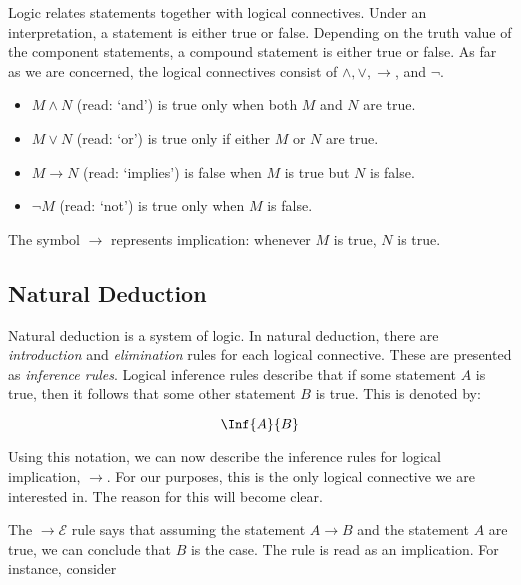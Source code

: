  Logic relates statements together with logical connectives.
  Under an interpretation, a statement is either true or false.
  Depending on the truth value of the component statements, a compound statement is either true or false.
  As far as we are concerned, the logical connectives consist of $\land, \lor, \to$, and $\neg$.
  \begin{itemize}
    \item $M \land N$ (read: `and') is true only when both $M$ and $N$ are true.
    \item $M \lor N$ (read: `or') is true only if either $M$ or $N$ are true. 
    \item $M \to N$ (read: `implies') is false when $M$ is true but $N$ is false.
    \item $\neg M$ (read: `not') is true only when $M$ is false.
  \end{itemize}
  The symbol $\to$ represents implication: whenever $M$ is true, $N$ is true.
  
  \subsection{Natural Deduction}
 
  Natural deduction is a system of logic.
  In natural deduction, there are \emph{introduction} and \emph{elimination} rules for each logical connective.
  These are presented as \emph{inference rules}.
  Logical inference rules describe that if some statement $A$ is true,
  then it follows that some other statement $B$ is true.
  This is denoted by:
  
  \[
    \Inf{A}{B} 
  \]
  
  Using this notation, we can now describe the inference rules for logical implication, $\to$.
  For our purposes, this is the only logical connective we are interested in.
  The reason for this will become clear.
  
  
  The $\to\mathcal{E}$ rule says that assuming the statement $A \to B$ and the statement $A$ are true,
  we can conclude that $B$ is the case. The rule is read as an implication.
  For instance, consider 
 
